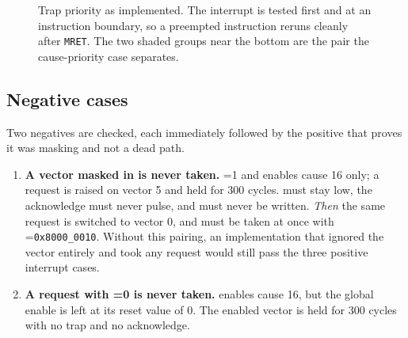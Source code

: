 \begin{figure}[H]
\centering
{}
\caption{Trap priority as implemented. The interrupt is tested first and at an
instruction boundary, so a preempted instruction reruns cleanly after
\texttt{MRET}. The two shaded groups near the bottom are the pair the
cause-priority case separates.}
\label{fig:trappri}
\end{figure}

\subsection*{Negative cases}

Two negatives are checked, each immediately followed by the positive that proves
it was masking and not a dead path.

\begin{enumerate}[leftmargin=*,itemsep=3pt]
\item \textbf{A vector masked in  is never taken.} =1
and  enables cause 16 only; a request is raised on vector 5 and held
for 300 cycles.  must stay low, the acknowledge must never
pulse, and  must never be written. \emph{Then} the same request is
switched to vector 0, and must be taken at once with
=\texttt{0x8000\_0010}. Without this pairing, an implementation that
ignored the vector entirely and took any request would still pass the three
positive interrupt cases.

\item \textbf{A request with =0 is never taken.} 
enables cause 16, but the global enable is left at its reset value of 0. The
enabled vector is held for 300 cycles with no trap and no acknowledge.
\end{enumerate}

